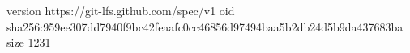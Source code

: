 version https://git-lfs.github.com/spec/v1
oid sha256:959ee307dd7940f9bc42feaafc0cc46856d97494baa5b2db24d5b9da437683ba
size 1231
